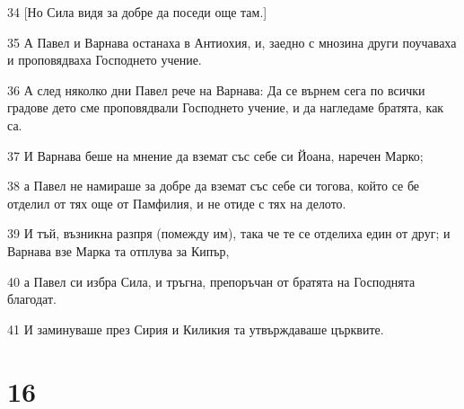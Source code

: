 \par 34 [Но Сила видя за добре да поседи още там.]
\par 35 А Павел и Варнава останаха в Антиохия, и, заедно с мнозина други поучаваха и проповядваха Господнето учение.
\par 36 А след няколко дни Павел рече на Варнава: Да се върнем сега по всички градове дето сме проповядвали Господнето учение, и да нагледаме братята, как са.
\par 37 И Варнава беше на мнение да вземат със себе си Йоана, наречен Марко;
\par 38 а Павел не намираше за добре да вземат със себе си тогова, който се бе отделил от тях още от Памфилия, и не отиде с тях на делото.
\par 39 И тъй, възникна разпря (помежду им), така че те се отделиха един от друг; и Варнава взе Марка та отплува за Кипър,
\par 40 а Павел си избра Сила, и тръгна, препоръчан от братята на Господнята благодат.
\par 41 И заминуваше през Сирия и Киликия та утвърждаваше църквите.

\chapter{16}

